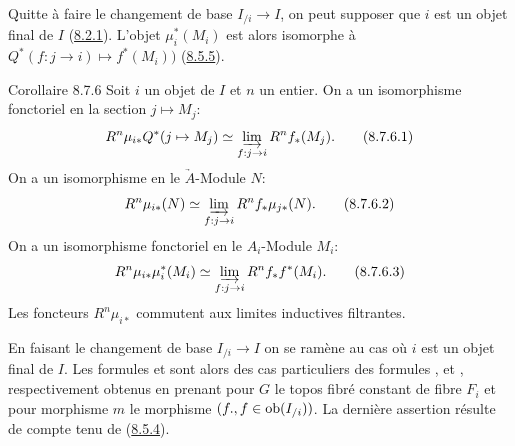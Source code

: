 \documentclass[10pt]{../fichiers-configuration-latex/smfart}
\begin{document}
Quitte à faire le changement de base $I_{/i} \to I$, on peut supposer
que $i$ est un objet final de $I$ (\hyperref[VI.lem8.2.1]{8.2.1}). L'objet $\mu_{i}^{\ast}
(M_i)$ est alors isomorphe à $Q^{\ast} (f : j \to i) \mapsto
f^{\ast}(M_i))$ (\cf \hyperref[VI.cor8.5.5]{8.5.5}).

\begin{enonce*}{Corollaire 8.7.6}
Soit $i$ un objet de $I$ et $n$ un entier. On a un isomorphisme
fonctoriel en la section $j \mapsto M_j$:
\begin{equation*}
R^n \mu_{i\ast} Q^{\ast} (j \mapsto M_j) \simeq \varinjlim_{f :
  j \to i} R^n f_{\ast} (M_j){\quoi}.\tag{8.7.6.1}
\end{equation*}
On a un isomorphisme en le $\underrightarrow{A}$-Module $N$:
\begin{equation*}
R^n \mu_{i\ast} (N) \simeq \varinjlim_{f:j\to i}
R^n f_{\ast} \mu_{j\ast} (N){\quoi}.\tag{8.7.6.2}
\end{equation*}
On a un isomorphisme fonctoriel en le $A_i$-Module $M_i$:
\begin{equation*}
R^n \mu_{i\ast} \mu^{\ast}_i (M_i) \simeq \varinjlim_{f:j\to i}
R^n f_{\ast} f^{\ast} (M_i){\quoi}.\tag{8.7.6.3}
\end{equation*}
Les foncteurs $R^n \mu_{i \ast}$ commutent aux limites inductives filtrantes.
\end{enonce*}

En faisant le changement de base $I_{/i} \to I$ on se ramène au cas où
$i$ est un objet final de $I$. Les formules  et 
sont alors des cas particuliers des formules ,  et
, respectivement obtenus en prenant pour $G$ le topos fibré
constant de fibre $F_i$ et pour morphisme $m$ le morphisme $(f., f \in
\operatorname{ob} (I_{/i}))$. La dernière assertion résulte de  compte tenu de
(\hyperref[VI.cor8.5.4]{8.5.4}).
\end{document}
